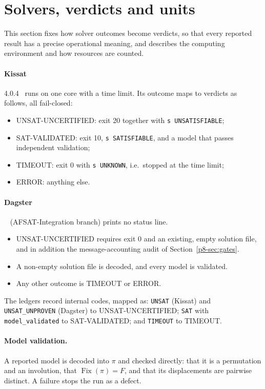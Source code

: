 \documentclass[11pt,a4paper,oneside]{report}
\theoremstyle{definition}
\newcommand{\Fix}{\operatorname{Fix}}
\newcommand{\code}[1]{\texttt{#1}}
\newcommand{\st}[1]{\textsf{#1}}
\begin{document}
\section{Solvers, verdicts and units}\label{p8-sec:solvers}
This section fixes how solver outcomes become verdicts, so that every reported result has a precise operational meaning, and describes the computing environment and how resources are counted.


\paragraph{Kissat} 4.0.4~\cite{p8-kissat} runs on one core with a time limit. Its outcome maps
to verdicts as follows, all fail-closed:
\begin{itemize}
\item \st{UNSAT-UNCERTIFIED}: exit 20 together with \code{s UNSATISFIABLE};
\item \st{SAT-VALIDATED}: exit 10, \code{s SATISFIABLE}, and a model that passes independent
validation;
\item \st{TIMEOUT}: exit 0 with \code{s UNKNOWN}, i.e.\ stopped at the time limit;
\item \st{ERROR}: anything else.
\end{itemize}

\paragraph{Dagster}~\cite{p8-dagster} (AFSAT-Integration branch) prints no status line.
\begin{itemize}
\item \st{UNSAT-UNCERTIFIED} requires exit 0 and an existing, empty solution file, and in
addition the message-accounting audit of Section~\ref{p8-sec:gates}.
\item A non-empty solution file is decoded, and every model is validated.
\item Any other outcome is \st{TIMEOUT} or \st{ERROR}.
\end{itemize}
The ledgers record internal codes, mapped as: \code{UNSAT} (Kissat) and \code{UNSAT\_UNPROVEN}
(Dagster) to \st{UNSAT-UNCERTIFIED}; \code{SAT} with \code{model\_validated} to
\st{SAT-VALIDATED}; and \code{TIMEOUT} to \st{TIMEOUT}.

\paragraph{Model validation.} A reported model is decoded into $\pi$ and checked directly:
that it is a permutation and an involution, that $\Fix(\pi)=F$, and that its displacements
are pairwise distinct. A failure stops the run as a defect.
\end{document}
